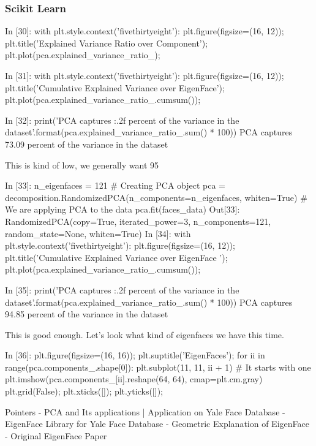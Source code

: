 \begin{frame}[fragile]
	\frametitle{Scikit Learn}
In [30]:
with plt.style.context('fivethirtyeight'):
    plt.figure(figsize=(16, 12));
    plt.title('Explained Variance Ratio over Component');
    plt.plot(pca.explained_variance_ratio_);

In [31]:
with plt.style.context('fivethirtyeight'):
    plt.figure(figsize=(16, 12));
    plt.title('Cumulative Explained Variance over EigenFace');
    plt.plot(pca.explained_variance_ratio_.cumsum());

In [32]:
print('PCA captures {:.2f} percent of the variance in the dataset'.format(pca.explained_variance_ratio_.sum() * 100))
PCA captures 73.09 percent of the variance in the dataset

This is kind of low, we generally want 95%

In [33]:
n_eigenfaces = 121
# Creating PCA object
pca = decomposition.RandomizedPCA(n_components=n_eigenfaces, whiten=True)
# We are applying PCA to the data
pca.fit(faces_data)
Out[33]:
RandomizedPCA(copy=True, iterated_power=3, n_components=121,
       random_state=None, whiten=True)
In [34]:
with plt.style.context('fivethirtyeight'):
    plt.figure(figsize=(16, 12));
    plt.title('Cumulative Explained Variance over EigenFace ');
    plt.plot(pca.explained_variance_ratio_.cumsum());

In [35]:
print('PCA captures {:.2f} percent of the variance in the dataset'.format(pca.explained_variance_ratio_.sum() * 100))
PCA captures 94.85 percent of the variance in the dataset

This is good enough. Let's look what kind of eigenfaces we have this time.

In [36]:
plt.figure(figsize=(16, 16));
plt.suptitle('EigenFaces');
for ii in range(pca.components_.shape[0]):
    plt.subplot(11, 11, ii + 1) # It starts with one
    plt.imshow(pca.components_[ii].reshape(64, 64), cmap=plt.cm.gray)
    plt.grid(False);
    plt.xticks([]);
    plt.yticks([]);

Pointers
- PCA and Its applications | Application on Yale Face Database - EigenFace Library for Yale Face Database - Geometric Explanation of EigenFace - Original EigenFace Paper
\end{frame}
